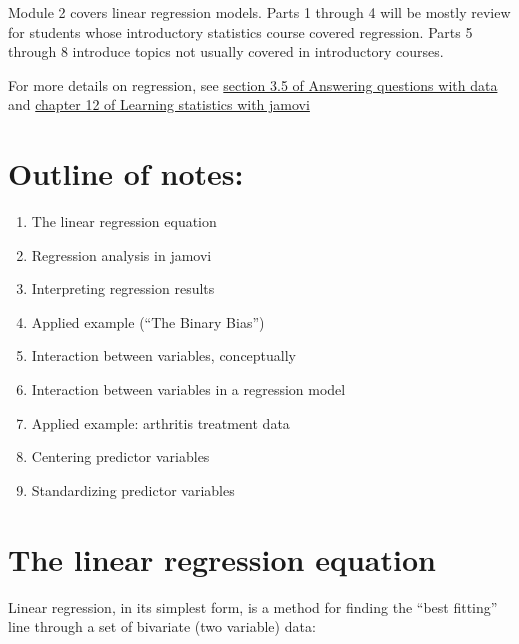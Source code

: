 \documentclass[
  letterpaper,
  DIV=11,
  numbers=noendperiod]{scrreprt}
\providecommand{\tightlist}{%
  \setlength{\itemsep}{0pt}\setlength{\parskip}{0pt}}\usepackage{longtable,booktabs,array}
\begin{document}
Module 2 covers linear regression models. Parts 1 through 4 will be
mostly review for students whose introductory statistics course covered
regression. Parts 5 through 8 introduce topics not usually covered in
introductory courses.

For more details on regression, see
\href{https://crumplab.com/statistics/03-Correlation.html\#regression-a-mini-intro}{section
3.5 of Answering questions with data} and
\href{https://davidfoxcroft.github.io/lsj-book/12-Correlation-and-linear-regression.html}{chapter
12 of Learning statistics with jamovi}

\hypertarget{outline-of-notes}{%
\section{Outline of notes:}\label{outline-of-notes}}

\begin{enumerate}
\def\labelenumi{\arabic{enumi}.}
\tightlist
\item
  The linear regression equation
\item
  Regression analysis in jamovi
\item
  Interpreting regression results
\item
  Applied example (``The Binary Bias'')
\item
  Interaction between variables, conceptually
\item
  Interaction between variables in a regression model
\item
  Applied example: arthritis treatment data
\item
  Centering predictor variables
\item
  Standardizing predictor variables
\end{enumerate}

\hypertarget{the-linear-regression-equation}{%
\section{The linear regression
equation}\label{the-linear-regression-equation}}

Linear regression, in its simplest form, is a method for finding the
``best fitting'' line through a set of bivariate (two variable) data:
\end{document}
